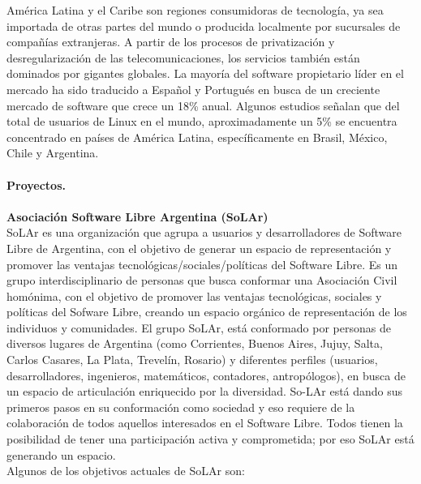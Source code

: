América Latina y el Caribe son regiones consumidoras de tecnología, ya sea importada de otras partes del mundo o producida localmente por sucursales de compañías extranjeras. A partir de los procesos de privatización y desregularización de las telecomunicaciones, los servicios también están dominados por gigantes globales. La mayoría del software propietario líder en el mercado ha sido traducido a Español y Portugués en busca de un creciente mercado de software que crece un 18\% anual.
Algunos estudios señalan que del total de usuarios de Linux en el mundo, aproximadamente un 5\% se encuentra concentrado en países de América Latina, específicamente en Brasil, México, Chile y Argentina.
\\
\\
{\bf Proyectos.}
\\
\\
{\bf Asociación Software Libre Argentina (SoLAr)}
\\
SoLAr es una organización que agrupa a usuarios y desarrolladores de Software Libre de Argentina, con el objetivo de generar un espacio de representación y promover las ventajas tecnológicas/sociales/políticas del Software Libre.
Es un grupo interdisciplinario de personas que busca conformar una Asociación Civil homónima, con el objetivo de promover las ventajas tecnológicas, sociales y políticas del Sofware Libre, creando un espacio orgánico de representación de los individuos y comunidades. El grupo SoLAr, está conformado por personas de diversos lugares de Argentina (como Corrientes, Buenos Aires, Jujuy, Salta, Carlos Casares, La Plata, Trevelín, Rosario) y diferentes perfiles (usuarios, desarrolladores, ingenieros, matemáticos,
contadores, antropólogos), en busca de un espacio de articulación enriquecido por la diversidad. So-LAr está dando sus primeros pasos en su conformación como sociedad y eso requiere de la colaboración de todos aquellos interesados en el Software Libre. Todos tienen la posibilidad de tener una participación activa y comprometida; por eso SoLAr está generando un espacio.
\\
Algunos de los objetivos actuales de SoLAr son:

